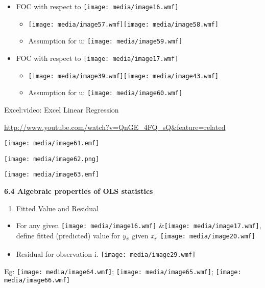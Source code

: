 \begin{itemize}
\item
  FOC with respect to \texttt{[image: media/image16.wmf]}

  \begin{itemize}
  \item
    \texttt{[image: media/image57.wmf]}\texttt{[image: media/image58.wmf]}
  \item
    Assumption for u: \texttt{[image: media/image59.wmf]}
  \end{itemize}
\item
  FOC with respect to \texttt{[image: media/image17.wmf]}

  \begin{itemize}
  \item
    \texttt{[image: media/image39.wmf]}\texttt{[image: media/image43.wmf]}
  \item
    Assumption for u: \texttt{[image: media/image60.wmf]}
  \end{itemize}
\end{itemize}

Excel:video: Excel Linear Regression

\url{http://www.youtube.com/watch?v=QnGE_4FQ_sQ\&feature=related}

\texttt{[image: media/image61.emf]}

\texttt{[image: media/image62.png]}

\texttt{[image: media/image63.emf]}

\textbf{6.4 Algebraic properties of OLS statistics}

\begin{enumerate}
\def\labelenumi{\arabic{enumi}.}
\item
  Fitted Value and Residual
\end{enumerate}

\begin{itemize}
\item
  For any given \texttt{[image: media/image16.wmf]}
  \&\texttt{[image: media/image17.wmf]}, define fitted (predicted) value
  for \emph{y\textsubscript{i}}, given \emph{x\textsubscript{i}}.
  \texttt{[image: media/image20.wmf]}
\item
  Residual for observation i. \texttt{[image: media/image29.wmf]}
\end{itemize}

Eg: \texttt{[image: media/image64.wmf]};
\texttt{[image: media/image65.wmf]}; \texttt{[image: media/image66.wmf]}

